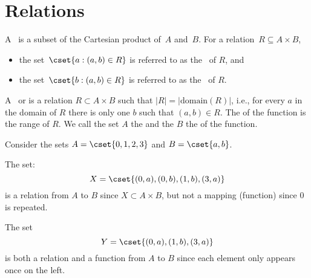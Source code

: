 \section{Relations}
\label{sec:bg::relations}

\begin{cluster}
\label{grp:def:bg::sets-and-relations::relation}

\begin{definition}[Relation]
\label{def:bg::sets-and-relations::relation}
A~ is a
subset of the Cartesian product of~$A$ and~$B$.  
For a relation~$R \subseteq A \times B$, 
\begin{itemize}
\item the set~$\cset{a : (a,b) \in
  R}$ is referred to as the~ of $R$, and 
\item 
the set~$\cset{b
  : (a,b) \in R}$ is referred to as the~ of $R$.
\end{itemize} 

\end{definition}
\end{cluster}

\begin{cluster}
\label{grp:def:bg::sets-and-relations::function}

\begin{definition}[Function]
\label{def:bg::sets-and-relations::function}
A~ or
is a relation $R \subset A \times B$
such that $|R| = |\mbox{domain}(R)|$, i.e., for every $a$ in the
domain of $R$ there is only one $b$ such that $(a,b) \in R$.  
The  of the function is the range of $R$.
We call the set $A$ the  and the $B$ the 
of the function.

\end{definition}
\end{cluster}

\begin{cluster}
\label{grp:ex:bg::relations::sequencesdef}

\begin{example}
\label{ex:bg::relations::sequencesdef}
Consider the sets $A = \cset{0,1,2,3}$ and $B = \cset{a,b}$.

The set:
\[X = \cset{(0,a),(0,b),(1,b),(3,a)}\]
is a relation from $A$ to $B$ since $X \subset A \times B$, but not a mapping (function) since $0$
is repeated.   

The set
\[Y = \cset{(0,a),(1,b),(3,a)}\]
is both a relation and a function from $A$ to $B$ since each element
only appears once on the left.  

\end{example}
\end{cluster}

